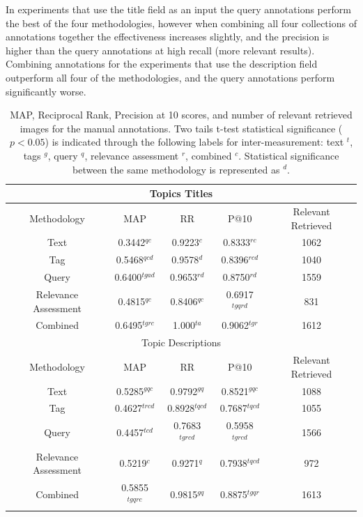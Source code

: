 In experiments that use the title field as an input the query annotations perform the best of the four methodologies, however when combining all four collections of annotations together the effectiveness increases slightly, and the precision is higher than the query annotations at high recall (more relevant results). Combining annotations for the experiments that use the description field outperform all four of the methodologies, and the query annotations perform significantly worse.

\begin{table}[ht]
    \begin{tabular}{|c|c|c|c|c|}
        \multicolumn{5}{c}{Topics Titles}\\ \hline
         Methodology & MAP & RR & P@10 & Relevant Retrieved \\ \hline
         Text & 0.3442$^{qc}$ & 0.9223$^{c}$ & 0.8333$^{rc}$ & 1062 \\ \hline
         Tag & 0.5468$^{qcd}$ & 0.9578$^{d}$ & 0.8396$^{rcd}$ & 1040 \\ \hline
         Query & 0.6400$^{tgad}$ & 0.9653$^{rd}$ & 0.8750$^{rd}$ & 1559 \\ \hline
         Relevance Assessment & 0.4815$^{qc}$ & 0.8406$^{qc}$ & 0.6917$^{tgqrd}$ & 831 \\ \hline
         Combined & 0.6495$^{tgrc}$ & 1.000$^{ta}$ & 0.9062$^{tgr}$ & 1612 \\ \hline
         \multicolumn{5}{c}{Topic Descriptions} \\ \hline
         Methodology & MAP & RR & P@10 & Relevant Retrieved \\ \hline
         Text & 0.5285$^{gqc}$ & 0.9792$^{gq}$ & 0.8521$^{gqc}$ & 1088 \\ \hline
         Tag & 0.4627$^{trcd}$ & 0.8928$^{tqcd}$ & 0.7687$^{tqcd}$ & 1055 \\ \hline
         Query & 0.4457$^{tcd}$ & 0.7683$^{tgrcd}$ & 0.5958$^{tgrcd}$ & 1566 \\ \hline
         Relevance Assessment & 0.5219$^{c}$ & 0.9271$^{q}$ & 0.7938$^{tqcd}$ & 972 \\ \hline
         Combined & 0.5855$^{tgqrc}$ & 0.9815$^{gq}$ & 0.8875$^{tgqr}$ & 1613 \\ \hline         
    \end{tabular}
    \caption{MAP, Reciprocal Rank, Precision at 10 scores, and number of relevant retrieved images for the manual annotations. Two tails t-test statistical significance ($p<0.05$) is indicated through the following labels for inter-measurement: text $^t$, tags $^g$, query $^q$, relevance assessment $^r$, combined $^c$. Statistical significance between the same methodology is represented as $^d$.}
    \label{table:manual-results}
\end{table}

